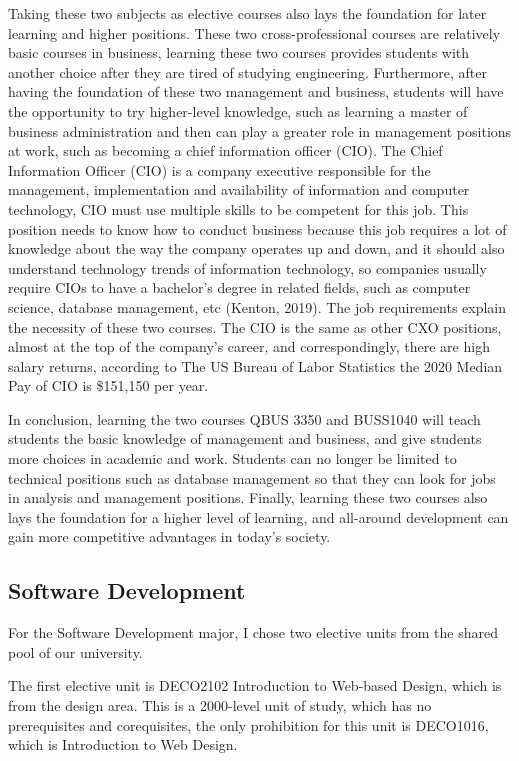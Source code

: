 \documentclass[12pt]{article}
\begin{document}
Taking these two subjects as elective courses also lays the foundation for later learning and higher positions. These two cross-professional courses are relatively basic courses in business, learning these two courses provides students with another choice after they are tired of studying engineering. Furthermore, after having the foundation of these two management and business, students will have the opportunity to try higher-level knowledge, such as learning a master of business administration and then can play a greater role in management positions at work, such as becoming a chief information officer (CIO). The Chief Information Officer (CIO) is a company executive responsible for the management, implementation and availability of information and computer technology, CIO must use multiple skills to be competent for this job. This position needs to know how to conduct business because this job requires a lot of knowledge about the way the company operates up and down, and it should also understand technology trends of information technology, so companies usually require CIOs to have a bachelor's degree in related fields, such as computer science, database management, etc (Kenton, 2019). The job requirements explain the necessity of these two courses. The CIO is the same as other CXO positions, almost at the top of the company's career, and correspondingly, there are high salary returns, according to The US Bureau of Labor Statistics the 2020 Median Pay of CIO is \$151,150 per year.

In conclusion, learning the two courses QBUS 3350 and BUSS1040 will teach students the basic knowledge of management and business, and give students more choices in academic and work. Students can no longer be limited to technical positions such as database management so that they can look for jobs in analysis and management positions. Finally, learning these two courses also lays the foundation for a higher level of learning, and all-around development can gain more competitive advantages in today's society.

\newpage
\subsection{Software Development}
For the Software Development major, I chose two elective units from the shared pool of our university.

The first elective unit is DECO2102 Introduction to Web-based Design, which is from the design area. This is a 2000-level unit of study, which has no prerequisites and corequisites, the only prohibition for this unit is DECO1016, which is Introduction to Web Design.
\end{document}
